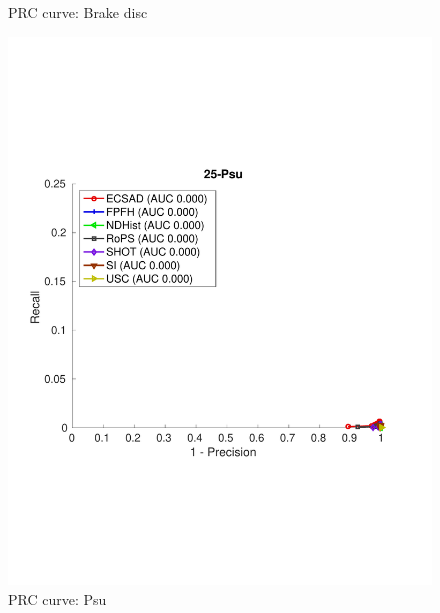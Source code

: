 \documentclass[10pt,twocolumn,letterpaper]{article}
\begin{document}
\begin{figure}[h]
\begin{minipage}[b]{.3\textwidth}
\caption{PRC curve: Brake disc}\label{fig:brake disc}
\end{minipage}
\begin{minipage}[b]{.3\textwidth}
\includegraphics[clip, trim=0.7cm 6cm 0.7cm 6cm,width=1.0\linewidth, height= 1.0\linewidth, keepaspectratio]{img/25-Psu_L2_RATIO_zoom.pdf}
\caption{PRC curve: Psu}\label{fig:noise}
\end{minipage}
\end{figure}
  



\clearpage
{\small


}
\end{document}
